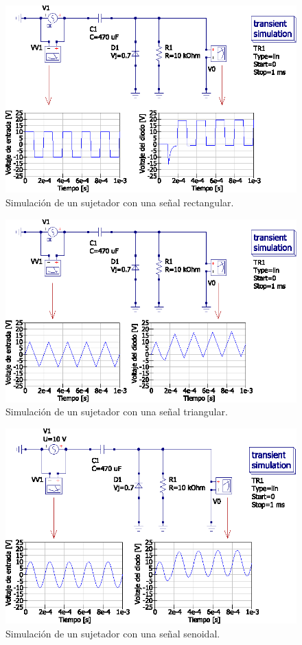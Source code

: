 \documentclass[letter,twoside,11pt]{article}
\begin{document}
{\begin{figure}[!h]
\centering
\includegraphics[scale=1.00]{simulacion/practica1.8.eps}
\caption{Simulación de un sujetador con una señal rectangular.}
\label{simulacion8}
\end{figure}

\begin{figure}[!h]
\centering
\includegraphics[scale=1.00]{simulacion/practica1.9.eps}
\caption{Simulación de un sujetador con una señal triangular.}
\label{simulacion9}
\end{figure}

\begin{figure}[!h]
\centering
\includegraphics[scale=1.00]{simulacion/practica1.10.eps}
\caption{Simulación de un sujetador con una señal senoidal.}
\label{simulacion10}
\end{figure}

}
\end{document}

